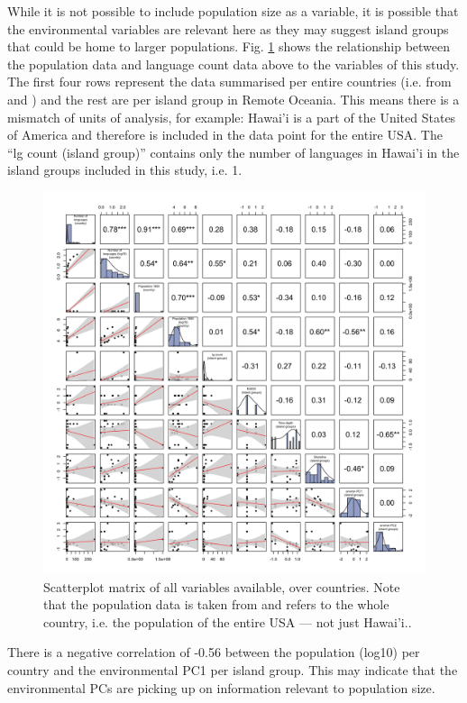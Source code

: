 \documentclass[12pt,letterpaper]{article}
\begin{document}
While it is not possible to include population size as a variable, it is possible that the environmental variables are relevant here as they may suggest island groups that could be home to larger populations. Fig. \ref{SPLOM_country_all_variables} shows the relationship between the population data and language count data above to the variables of this study. The first four rows represent the data summarised per entire countries  (i.e. from  \citet{UN_pop} and \citet{glottolog4_5}) and the rest are per island group in Remote Oceania. This means there is a mismatch of units of analysis, for example: Hawai'i is a part of the United States of America and therefore is included in the data point for the entire USA. The ``lg count (island group)'' contains only the number of languages in Hawai'i in the island groups included in this study, i.e. 1.

\begin{figure}[ht]
    \includegraphics[width=15cm]{latex/SPLOM_country_all_variables.png}
\caption{Scatterplot matrix of all variables available, over countries. Note that the population data is taken from \citet{UN_pop} and refers to the whole country, i.e. the population of the entire USA --- not just Hawai'i..}
\label{SPLOM_country_all_variables}
\end{figure}


There is a negative correlation of -0.56 between the population (log10) per country and the environmental PC1 per island group. This may indicate that the environmental PCs are picking up on information relevant to population size.
\end{document}
